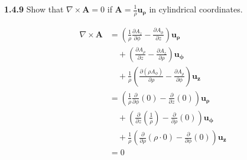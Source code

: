 \documentclass{article}
\begin{document}
\textbf{1.4.9} Show that $\nabla \times \mathbf{A} = 0$ if $\mathbf{A} = \frac{1}{\rho}\mathbf{u_\rho}$ in cylindrical
coordinates.

\begin{equation*}
	\begin{split}
		\nabla \times \mathbf{A} & = \left(\frac{1}{\rho}\frac{\partial A_z}{\partial \phi} - \frac{\partial A_\phi}{\partial z}\right) \mathbf{u_\rho} \\
		& \quad + \left(\frac{\partial A_\rho}{\partial z} - \frac{\partial A_z}{\partial \rho}\right) \mathbf{u_\phi} \\
		& \quad + \frac{1}{\rho}\left(\frac{\partial (\rho A_\phi)}{\partial \rho} - \frac{\partial A_\rho}{\partial \phi}\right) \mathbf{u_z} \\
		& = \left(\frac{1}{\rho}\frac{\partial}{\partial \phi}(0) - \frac{\partial}{\partial z}(0)\right) \mathbf{u_\rho} \\
		& \quad + \left(\frac{\partial}{\partial z}\left(\frac{1}{\rho}\right) - \frac{\partial}{\partial \rho}(0)\right) \mathbf{u_\phi} \\
		& \quad + \frac{1}{\rho}\left(\frac{\partial}{\partial \rho}(\rho \cdot 0) - \frac{\partial}{\partial \phi}(0)\right) \mathbf{u_z} \\
		& = 0
	\end{split}
\end{equation*}
\end{document}
